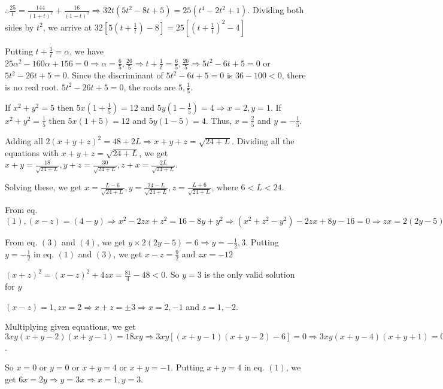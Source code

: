   $\therefore \frac{25}{t} = \frac{144}{(1 + t)^2} + \frac{16}{(1 - t)^2}\Rightarrow 32t(5t^2 - 8t + 5) =
  25(t^4 - 2t^2 + 1)$. Dividing both sides by $t^2$, we arrive at $32\left[5\left(t + \frac{1}{t}\right) -
    8\right] = 25\left[\left(t + \frac{1}{t}\right)^2 - 4\right]$

  Putting $t + \frac{1}{t} = \alpha$, we have $25\alpha^2 - 160\alpha + 156 = 0\Rightarrow \alpha =
  \frac{6}{5}, \frac{26}{5}\Rightarrow t + \frac{1}{t} = \frac{6}{5}, \frac{26}{5}\Rightarrow 5t^2 - 6t + 5
  = 0$ or $5t^2 - 26t + 5 = 0$. Since the discriminant of $5t^2 -6t + 5 = 0$ is $36 - 100 < 0$, there is no
  real root. $5t^2 - 26t + 5 = 0$, the roots are $5, \frac{1}{5}$.

  If $x^2 + y^2 = 5$ then $5x\left(1 + \frac{1}{5}\right) = 12$ and $5y\left(1 - \frac{1}{5}\right) = 4
  \Rightarrow x = 2, y = 1$. If $x^2 + y^2 = \frac{1}{5}$ then $5x(1 + 5) = 12$ and $5y(1 - 5) = 4$. Thus,
  $x = \frac{2}{5}$ and $y = -\frac{1}{5}$.
\item Adding all $2(x + y + z)^2 = 48 + 2L \Rightarrow x + y + z = \sqrt{24 + L}$. Dividing all the
  equations with $x + y + z = \sqrt{24 + L}$, we get $x + y = \frac{18}{\sqrt{24 + L}}, y + z =
  \frac{30}{\sqrt{24 + L}}, z + x = \frac{2L}{\sqrt{24 + L}}$.

  Solving these, we get $x = \frac{L - 6}{\sqrt{24 + L}}, y = \frac{24 - L}{\sqrt{24 + L}}, z = \frac{L +
    6}{\sqrt{24 + L}}$, where $6 < L < 24$.
\item From eq. $(1), (x - z) = (4 - y)\Rightarrow x^2 - 2zx + z^2 = 16 - 8y + y^2 \Rightarrow (x^2 + z^2 -
  y^2) - 2zx + 8y - 16 = 0 \Rightarrow zx = 2(2y - 5)[\because x^2 + y^2 - z^2 = -4] \cdots (4)$

  From eq. $(3)$ and $(4)$, we get $y\times2(2y - 5) = 6 \Rightarrow y = -\frac{1}{2}, 3$. Putting $y =
  -\frac{1}{2}$ in eq. $(1)$ and $(3)$, we get $x - z = \frac{9}{2}$ and $zx = -12$

  $(x + z)^2 = (x - z)^2 + 4zx = \frac{81}{4} - 48 < 0$. So $y = 3$ is the only valid solution for $y$

  $(x - z) = 1, zx = 2 \Rightarrow x + z = \pm3\Rightarrow x = 2, -1$ and $z = 1, -2$.
\item Multiplying given equations, we get $3xy(x + y - 2)(x + y - 1) = 18xy \Rightarrow 3xy[(x + y - 1)(x +
  y - 2) - 6] = 0\Rightarrow 3xy(x + y - 4)(x + y + 1) = 0$.

  So $x = 0$ or $y = 0$ or $x + y = 4$ or $x + y = -1$. Putting $x + y = 4$ in eq. $(1)$, we get $6x = 2y
  \Rightarrow y = 3x\Rightarrow x = 1, y = 3$.


